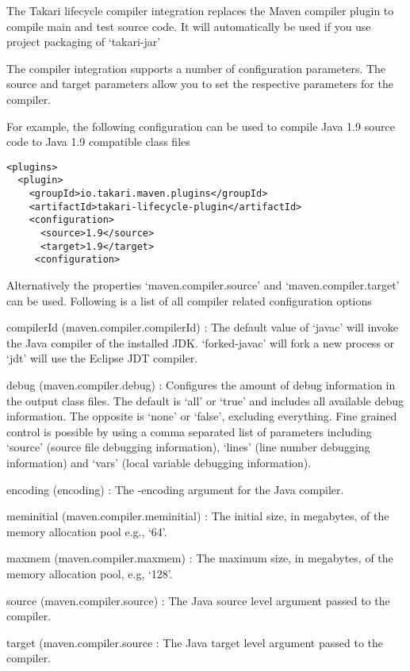\documentclass[a4paper]{book}
\begin{document}
The Takari lifecycle compiler integration replaces the Maven compiler plugin to compile main and test source code. It will automatically be used if you use project packaging of `takari-jar'

The compiler integration supports a number of configuration parameters. The source and target parameters allow you to set the respective parameters for the compiler.

For example, the following configuration can be used to compile Java 1.9 source code to Java 1.9 compatible class files

\begin{shaded}\begin{verbatim}
<plugins>
  <plugin>
    <groupId>io.takari.maven.plugins</groupId>
    <artifactId>takari-lifecycle-plugin</artifactId>
    <configuration>
      <source>1.9</source>
      <target>1.9</target>
     <configuration>
\end{verbatim}\end{shaded}

Alternatively the properties `maven.compiler.source' and `maven.compiler.target' can be used. Following is a list of all compiler related configuration options

compilerId (maven.compiler.compilerId) : The default value of `javac' will invoke the Java compiler of the installed JDK. `forked-javac' will fork a new process or `jdt' will use the Eclipse JDT compiler.

debug (maven.compiler.debug) : Configures the amount of debug information in the output class files. The default is `all' or `true' and includes all available debug information. The opposite is `none' or `false', excluding everything. Fine grained control is possible by using a comma separated list of parameters including `source' (source file debugging information), `lines' (line number debugging information) and `vars' (local variable debugging information).

encoding (encoding) : The -encoding argument for the Java compiler.

meminitial (maven.compiler.meminitial) : The initial size, in megabytes, of the memory allocation pool e.g., `64'.

maxmem (maven.compiler.maxmem) : The maximum size, in megabytes, of the memory allocation pool, e.g, `128'.

source (maven.compiler.source) : The Java source level argument passed to the compiler.

target (maven.compiler.source : The Java target level argument passed to the compiler.
\end{document}
